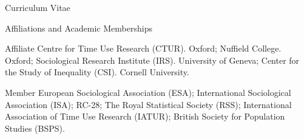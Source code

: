 \documentclass[12pt,a4paper]{article}
\begin{document}
\begin{cv}{Curriculum Vitae}
\begin{cvlist}{Affiliations and Academic Memberships}
	\item[Affiliate] Centre for Time Use Research (CTUR). Oxford; Nuffield College. Oxford; Sociological Research Institute (IRS). University of Geneva; Center for the Study of Inequality (CSI). Cornell University. 
	\item[Member] European Sociological Association (ESA); International Sociological Association (ISA); RC-28; The Royal Statistical Society (RSS); International Association of Time Use Research (IATUR); 
	British Society for Population Studies (BSPS). 
\end{cvlist}

  \date{~September~2019}
\end{cv}
\end{document}
